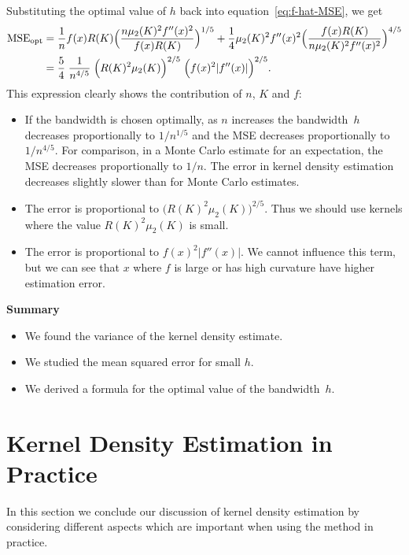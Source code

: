 \documentclass[
  a4paper,
]{article}
\providecommand{\tightlist}{%
  \setlength{\itemsep}{0pt}\setlength{\parskip}{0pt}}
\theoremstyle{definition}
\theoremstyle{definition}
\theoremstyle{definition}
\theoremstyle{definition}
\theoremstyle{remark}
\begin{document}
Substituting the optimal value of \(h\) back into equation~\eqref{eq:f-hat-MSE},
we get
\begin{align*}
  \mathop{\mathrm{MSE}}\nolimits_\mathrm{opt}
  &= \frac{1}{n} f(x) R(K) \Bigl( \frac{n \mu_2(K)^2 f''(x)^2}{f(x) R(K)} \Bigr)^{1/5}
     + \frac14 \mu_2(K)^2 f''(x)^2 \Bigl( \frac{f(x) R(K)}{n \mu_2(K)^2 f''(x)^2} \Bigr)^{4/5} \\
  &= \frac54 \; \frac{1}{n^{4/5}}
      \; \Bigl( R(K)^2 \mu_2(K) \Bigr)^{2/5}
      \; \Bigl( f(x)^2 |f''(x)| \Bigr)^{2/5}.
\end{align*}
This expression clearly shows the contribution of \(n\), \(K\) and \(f\):

\begin{itemize}
\item
  If the bandwidth is chosen optimally, as \(n\) increases the bandwidth~\(h\)
  decreases proportionally to \(1/n^{1/5}\) and the MSE decreases
  proportionally to \(1 / n^{4/5}\). For comparison, in a Monte Carlo
  estimate for an expectation, the MSE decreases proportionally to \(1/n\).
  The error in kernel density estimation decreases slightly slower than
  for Monte Carlo estimates.
\item
  The error is proportional to \(\bigl( R(K)^2 \mu_2(K) \bigr)^{2/5}\).
  Thus we should use kernels where the value \(R(K)^2 \mu_2(K)\)
  is small.
\item
  The error is proportional to \(f(x)^2 |f''(x)|\). We cannot influence
  this term, but we can see that \(x\) where \(f\) is large or has
  high curvature have higher estimation error.
\end{itemize}

\textbf{Summary}

\begin{itemize}
\tightlist
\item
  We found the variance of the kernel density estimate.
\item
  We studied the mean squared error for small \(h\).
\item
  We derived a formula for the optimal value of the bandwidth~\(h\).
\end{itemize}

\clearpage

\section{Kernel Density Estimation in Practice}\label{X04-practice}

In this section we conclude our discussion of kernel density estimation
by considering different aspects which are important when using the method
in practice.
\end{document}
